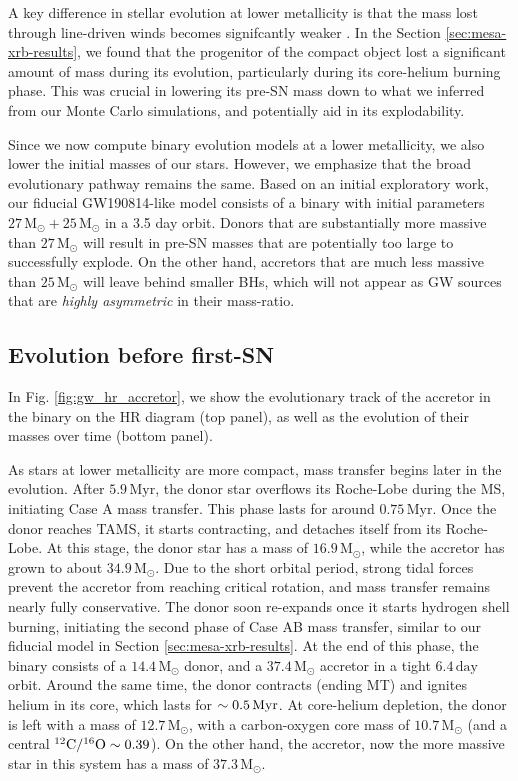 \documentclass[linenumbers,trackchanges,twocolumn]{aastex701}
\newcommand{\Mdot}{\mathrm{M}_{\odot}}
\begin{document}
A key difference in stellar evolution at lower metallicity is that the
mass lost through line-driven winds becomes signifcantly weaker
\citep[e.g.,][]{2001A&A...369..574V,2007A&A...473..603M}. In the
Section \ref{sec:mesa-xrb-results}, we found that the progenitor of the compact object lost a significant amount of mass during its evolution, particularly during its core-helium burning phase. This was crucial in lowering its pre-SN mass down to what we inferred from our Monte Carlo simulations, and potentially aid in its explodability.

Since we now compute binary evolution models at a lower metallicity, we also lower the initial masses of our stars. However, we emphasize that the broad evolutionary pathway remains the same. Based on an initial exploratory work, our fiducial GW190814-like model consists of a binary with initial parameters $27\,\Mdot+25\,\Mdot$ in a 3.5 day orbit. Donors that are substantially more massive than $27\,\Mdot$ will result in pre-SN masses that are potentially too large to successfully explode. On the other hand, accretors that are much less massive than $25\,\Mdot$ will leave behind smaller BHs, which will not appear as GW sources that are \textit{highly asymmetric} in their mass-ratio.

\subsection{Evolution before first-SN}

In Fig. \ref{fig:gw_hr_accretor}, we show the evolutionary track of the accretor in the binary on the HR diagram (top panel), as well as the evolution of their masses over time (bottom panel).

As stars at lower metallicity are more compact, mass transfer begins later in the evolution. After $5.9 \,\mathrm{Myr}$, the donor star overflows its Roche-Lobe during the MS, initiating Case A mass transfer. This phase lasts for around $0.75 \,\mathrm{Myr}$. Once the donor reaches TAMS, it starts contracting, and detaches itself from its Roche-Lobe. At this stage, the donor star has a mass of $16.9\,\Mdot$, while the accretor has grown to about $34.9\,\Mdot$. Due to the short orbital period, strong tidal forces prevent the accretor from reaching critical rotation, and mass transfer remains nearly fully conservative. The donor soon re-expands once it starts hydrogen shell burning, initiating the second phase of Case AB mass transfer, similar to our fiducial model in Section \ref{sec:mesa-xrb-results}. At the end of this phase, the binary consists of a $14.4\,\Mdot$ donor, and a $37.4\,\Mdot$ accretor in a tight $6.4\,\mathrm{day}$ orbit. Around the same time, the donor contracts (ending MT) and ignites helium in its core, which lasts for $\sim 0.5 \, \rm Myr$. At core-helium depletion, the donor is left with a mass of $12.7\,\Mdot$, with a carbon-oxygen core mass of $10.7\,\Mdot$ (and a central $\rm ^{12}C/^{16}O \sim 0.39$). On the other hand, the accretor, now the more massive star in this system has a mass of $37.3\,\Mdot$.
\end{document}
